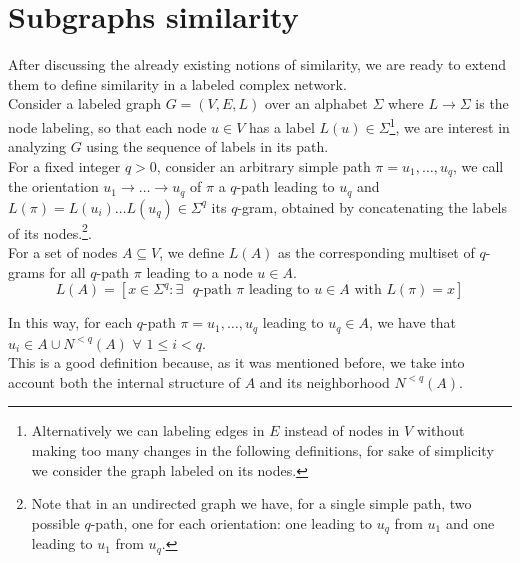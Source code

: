 \section{Subgraphs similarity}

After discussing the already existing notions of similarity, we are ready to extend them to define similarity in a labeled complex network.\\

Consider a labeled graph $G = (V, E, L)$ over an alphabet $\Sigma$ where $L \rightarrow \Sigma$ is the node labeling, so that each node $u \in V$ has a label $L(u) \in \Sigma$\footnote{Alternatively we can labeling edges in $E$ instead of nodes in $V$ without making too many changes in the following definitions, for sake of simplicity we consider the graph labeled on its nodes.}, we are interest in analyzing $G$ using the sequence of labels in its path.\\

For a fixed integer $q > 0$, consider an arbitrary simple path $\pi = u_{1}, \ldots, u_{q}$, we call the orientation $u_{1} \rightarrow \ldots \rightarrow u_{q}$ of $\pi$ a $q$-path leading to $u_{q}$ and $L(\pi) = L(u_{i}) \ldots L(u_{q}) \in \Sigma^{q}$ its $q$-gram, obtained by concatenating the labels of its nodes.\footnote{Note that in an undirected graph we have, for a single simple path, two possible $q$-path, one for each orientation: one leading to $u_{q}$ from $u_{1}$ and one leading to $u_{1}$ from $u_{q}$.}.\\

For a set of nodes $A \subseteq V$, we define $L(A)$ as the corresponding multiset of $q$-grams for all $q$-path $\pi$ leading to a node $u \in A$. 
\begin{equation}
L(A) = [x \in \Sigma^{q} : \exists \text{ $q$-path } \pi \text{ leading to } u \in A \text{ with } L(\pi) = x]
\end{equation}

In this way, for each $q$-path $\pi = u_{1}, \ldots, u_{q}$ leading to $u_{q} \in A$, we have that $u_{i} \in A \cup N^{<q}(A)$ $\forall$ $1 \leq i < q$. \\

This is a good definition because, as it was mentioned before, we take into account both the internal structure of $A$ and its neighborhood $N^{<q}(A)$. 

